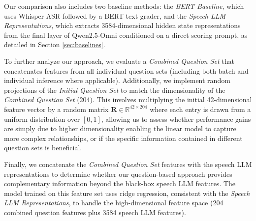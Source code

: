 \documentclass{report}
\begin{document}
Our comparison also includes two baseline methods: the \emph{BERT Baseline}, which uses Whisper ASR followed by a BERT text grader, and the \emph{Speech LLM Representations}, which extracts 3584-dimensional hidden state representations from the final layer of Qwen2.5-Omni conditioned on a direct scoring prompt, as detailed in Section \ref{sec:baselines}.

To further analyze our approach, we evaluate a \emph{Combined Question Set} that concatenates features from all individual question sets (including both batch and individual inference where applicable). Additionally, we implement random projections of the \emph{Initial Question Set} to match the dimensionality of the \emph{Combined Question Set} (204). This involves multiplying the initial 42-dimensional feature vector by a random matrix $\mathbf{R} \in \mathbb{R}^{42 \times 204}$ where each entry is drawn from a uniform distribution over $[0, 1]$, allowing us to assess whether performance gains are simply due to higher dimensionality enabling the linear model to capture more complex relationships, or if the specific information contained in different question sets is beneficial.

Finally, we concatenate the \emph{Combined Question Set} features with the speech LLM representations to determine whether our question-based approach provides complementary information beyond the black-box speech LLM features. The model trained on this feature set uses ridge regression, consistent with the \emph{Speech LLM Representations}, to handle the high-dimensional feature space (204 combined question features plus 3584 speech LLM features).
\end{document}
